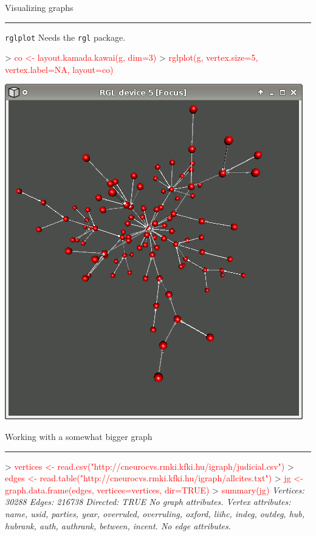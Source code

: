 \documentclass[landscape]{foils}
\newcommand{\stitle}[1]{{\centering\color{blue}\Large #1\par\vspace*{10pt}\hrule}}
\newcommand{\command}[1]{\textcolor{red}{#1}}
\begin{document}
\newpage
\stitle{Visualizing graphs}
\verb+rglplot+ Needs the \verb+rgl+ package.
\begin{Myverb}
> \command{co <- layout.kamada.kawai(g, dim=3)}
> \command{rglplot(g, vertex.size=5, }
\command{           vertex.label=NA, }
\command{           layout=co)}
\end{Myverb}
\begin{flushright}
\vspace*{-6cm}
\enlargethispage{3cm}
\includegraphics{rglplot}
\end{flushright}

\newpage
\stitle{Working with a somewhat bigger graph}
\begin{Myverb}
> \command{vertices <- read.csv("http://cneurocvs.rmki.kfki.hu/igraph/judicial.csv")}
> \command{edges <- read.table("http://cneurocvs.rmki.kfki.hu/igraph/allcites.txt")}
> \command{jg <- graph.data.frame(edges, vertices=vertices, dir=TRUE)}
> \command{summary(jg)}
\slshape Vertices: 30288 
\slshape Edges: 216738 
\slshape Directed: TRUE 
\slshape No graph attributes.
\slshape Vertex attributes: name, usid, parties, year, overruled, overruling,
\slshape   oxford, liihc, indeg, outdeg, hub, hubrank, auth, authrank, between, incent.
\slshape No edge attributes.
\end{Myverb}
\end{document}
